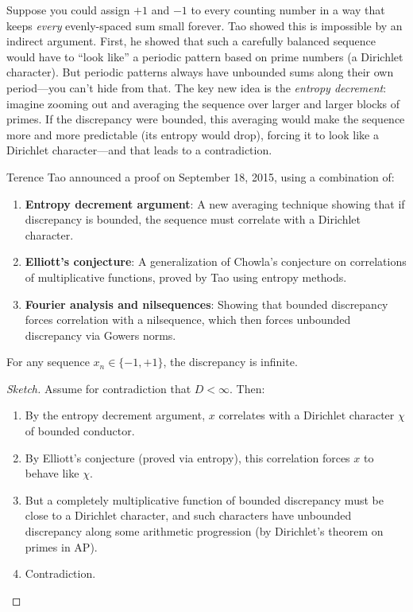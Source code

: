 Suppose you could assign $+1$ and $-1$ to every counting number in a way that keeps \emph{every} evenly-spaced sum small forever. Tao showed this is impossible by an indirect argument. First, he showed that such a carefully balanced sequence would have to ``look like'' a periodic pattern based on prime numbers (a Dirichlet character). But periodic patterns always have unbounded sums along their own period---you can't hide from that. The key new idea is the \emph{entropy decrement}: imagine zooming out and averaging the sequence over larger and larger blocks of primes. If the discrepancy were bounded, this averaging would make the sequence more and more predictable (its entropy would drop), forcing it to look like a Dirichlet character---and that leads to a contradiction.

\bigskip

Terence Tao announced a proof on September 18, 2015, using a combination of:

\begin{enumerate}
\item \textbf{Entropy decrement argument}: A new averaging technique showing that if discrepancy is bounded, the sequence must correlate with a Dirichlet character.
\item \textbf{Elliott's conjecture}: A generalization of Chowla's conjecture on correlations of multiplicative functions, proved by Tao using entropy methods.
\item \textbf{Fourier analysis and nilsequences}: Showing that bounded discrepancy forces correlation with a nilsequence, which then forces unbounded discrepancy via Gowers norms.
\end{enumerate}

\begin{theorem}
For any sequence $x_n \in \{-1, +1\}$, the discrepancy is infinite.
\end{theorem}

\begin{proof}[Sketch]
Assume for contradiction that $D < \infty$. Then:
\begin{enumerate}
\item By the entropy decrement argument, $x$ correlates with a Dirichlet character $\chi$ of bounded conductor.
\item By Elliott's conjecture (proved via entropy), this correlation forces $x$ to behave like $\chi$.
\item But a completely multiplicative function of bounded discrepancy must be close to a Dirichlet character, and such characters have unbounded discrepancy along some arithmetic progression (by Dirichlet's theorem on primes in AP).
\item Contradiction.
\end{enumerate}
\end{proof}

